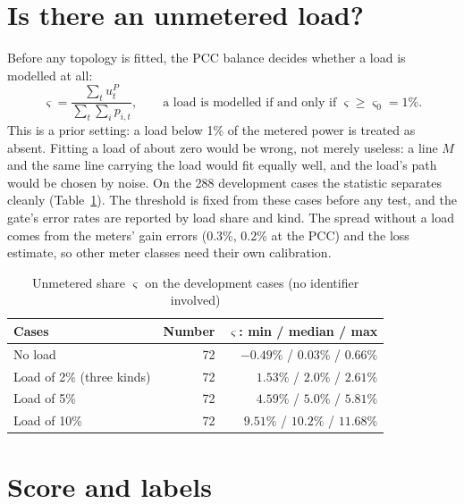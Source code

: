 \documentclass[journal,onecolumn,11pt]{IEEEtran}
\begin{document}
\section{Is there an unmetered load?}\label{sec:gate}

Before any topology is fitted, the PCC balance decides whether a load is modelled at all:
\begin{equation}\label{eq:gate}
\varsigma=\frac{\sum_tu^P_t}{\sum_t\sum_ip_{i,t}},\qquad\text{a load is modelled if and only if }\varsigma\ge\varsigma_0=1\%.
\end{equation}
This is a prior setting: a load below 1\% of the metered power is treated as absent. Fitting a load of about zero would be
wrong, not merely useless: a line $M$ and the same line carrying the load would fit equally well, and the load's path would
be chosen by noise. On the 288 development cases the statistic separates cleanly (Table~\ref{tab:gate}). The threshold is
fixed from these cases before any test, and the gate's error rates are reported by load share and kind. The spread without a
load comes from the meters' gain errors (0.3\%, 0.2\% at the PCC) and the loss estimate, so other meter classes need their
own calibration.
\begin{table}[h]
\caption{Unmetered share $\varsigma$ on the development cases (no identifier involved)}\label{tab:gate}
\centering
\begin{tabular}{@{}lrr@{}}
\toprule
Cases & Number & $\varsigma$: min / median / max\\
\midrule
No load & 72 & $-0.49\%$ / $0.03\%$ / $0.66\%$\\
Load of 2\% (three kinds) & 72 & $1.53\%$ / $2.0\%$ / $2.61\%$\\
Load of 5\% & 72 & $4.59\%$ / $5.0\%$ / $5.81\%$\\
Load of 10\% & 72 & $9.51\%$ / $10.2\%$ / $11.68\%$\\
\bottomrule
\end{tabular}
\end{table}

\section{Score and labels}\label{sec:score}
\end{document}
